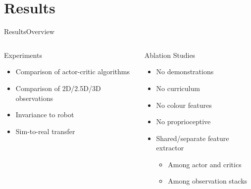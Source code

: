 \section{Results}

\begin{frame}{Results}{Overview}
    \begin{columns}%
        \begin{column}{0.5\textwidth}%
            \begin{block}{Experiments}
                \begin{itemize}
                    \item Comparison of actor-critic algorithms
                    \item Comparison of 2D/2.5D/3D observations
                    \item Invariance to robot
                    \item Sim-to-real transfer
                \end{itemize}
            \end{block}
        \end{column}
        \begin{column}{0.5\textwidth}%
            \begin{block}{Ablation Studies}
                \begin{itemize}
                    \item No demonstrations
                    \item No curriculum
                    \item No colour features
                    \item No proprioceptive
                    \item Shared/separate feature extractor
                          \begin{itemize}
                              \item Among actor and critics
                              \item Among observation stacks
                          \end{itemize}
                \end{itemize}
            \end{block}
        \end{column}
    \end{columns}
\end{frame}

